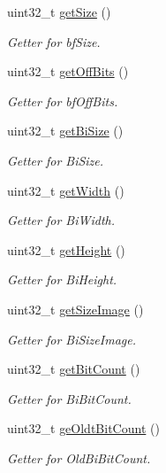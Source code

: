 \begin{DoxyCompactItemize}
uint32\+\_\+t \mbox{\hyperlink{classBitmapHeader_a53309aa035484da90e8170f9950aa86b}{get\+Size}} ()
\begin{DoxyCompactList}\small\item\em Getter for bf\+Size. \end{DoxyCompactList}\item 
uint32\+\_\+t \mbox{\hyperlink{classBitmapHeader_a70702e4d8aba2a3502f776f73bfecde8}{get\+Off\+Bits}} ()
\begin{DoxyCompactList}\small\item\em Getter for bf\+Off\+Bits. \end{DoxyCompactList}\item 
uint32\+\_\+t \mbox{\hyperlink{classBitmapHeader_acce4b6292e2aaf5dbd4bc10687c4fb65}{get\+Bi\+Size}} ()
\begin{DoxyCompactList}\small\item\em Getter for Bi\+Size. \end{DoxyCompactList}\item 
uint32\+\_\+t \mbox{\hyperlink{classBitmapHeader_af1d36ee9f3315866f05c39c2f4871e09}{get\+Width}} ()
\begin{DoxyCompactList}\small\item\em Getter for Bi\+Width. \end{DoxyCompactList}\item 
uint32\+\_\+t \mbox{\hyperlink{classBitmapHeader_a106f72d6c256327342029edf8e18bde1}{get\+Height}} ()
\begin{DoxyCompactList}\small\item\em Getter for Bi\+Height. \end{DoxyCompactList}\item 
uint32\+\_\+t \mbox{\hyperlink{classBitmapHeader_aa55f157d6852ce35add8c5db54ccadae}{get\+Size\+Image}} ()
\begin{DoxyCompactList}\small\item\em Getter for Bi\+Size\+Image. \end{DoxyCompactList}\item 
uint32\+\_\+t \mbox{\hyperlink{classBitmapHeader_a2660782990f1d9547e0aef501f666969}{get\+Bit\+Count}} ()
\begin{DoxyCompactList}\small\item\em Getter for Bi\+Bit\+Count. \end{DoxyCompactList}\item 
uint32\+\_\+t \mbox{\hyperlink{classBitmapHeader_a38ee7e201d7698c591d9ae3335515468}{ge\+Oldt\+Bit\+Count}} ()
\begin{DoxyCompactList}\small\item\em Getter for Old\+Bi\+Bit\+Count. \end{DoxyCompactList}\item 

\end{DoxyCompactItemize}
